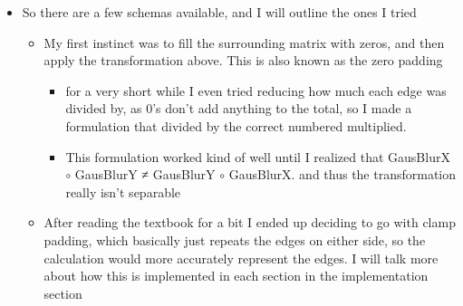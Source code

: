 \documentclass{article}
\begin{document}
\begin{enumerate}
\begin{itemize}
\item So there are a few schemas available, and I will outline the ones I tried
\begin{itemize}
\item My first instinct was to fill the surrounding matrix with zeros, and
then apply the transformation above. This is also known as the
zero padding
\begin{itemize}
\item for a very short while I even tried reducing how much each
edge was divided by, as 0's don't add anything to the total, so
I made a formulation that divided by the correct numbered multiplied.
\item This formulation worked kind of well until I realized that
GausBlurX $\circ$ GausBlurY ≠ GausBlurY $\circ$ GausBlurX. and thus the
transformation really isn't separable
\end{itemize}
\item After reading the textbook for a bit I ended up deciding to go
with clamp padding, which basically just repeats the edges on
either side, so the calculation would more accurately represent
the edges. Ι will talk more about how this is implemented in each
section in the implementation section
\end{itemize}
\end{itemize}
\end{enumerate}
\end{document}
